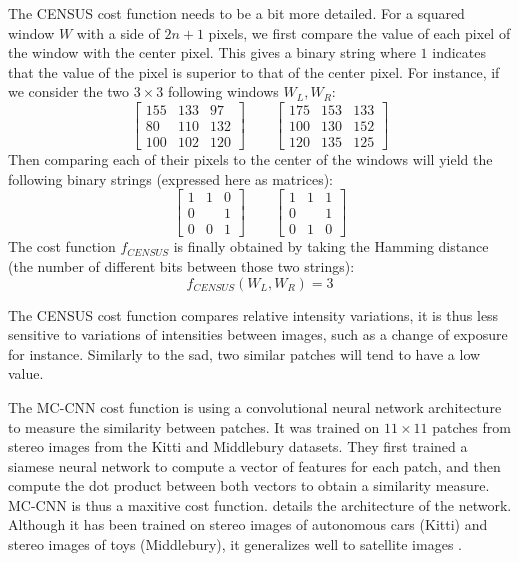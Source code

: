 \begin{example}
	The CENSUS cost function needs to be a bit more detailed. For a squared window $W$ with a side of $2n+1$ pixels, we first compare the value of each pixel of the window with the center pixel. This gives a binary string where $1$ indicates that the value of the pixel is superior to that of the center pixel. For instance, if we consider the two $3\times3$ following windows $W_L, W_R$:
	$$
    \begin{bmatrix}
        155 & 133 & 97 \\
        80 & 110 & 132 \\
        100 & 102 & 120
    \end{bmatrix}
    \qquad
    \begin{bmatrix}
        175 & 153 & 133 \\
        100 & 130 & 152 \\
        120 & 135 & 125
    \end{bmatrix}
	$$
	Then comparing each of their pixels to the center of the windows will yield the following binary strings (expressed here as matrices):
	$$
    \begin{bmatrix}
        1 & 1 & 0 \\
        0 &  & 1 \\
        0 & 0 & 1
    \end{bmatrix}
    \qquad
    \begin{bmatrix}
        1 & 1 & 1 \\
        0 &  & 1 \\
        0 & 1 & 0
    \end{bmatrix}
	$$
	The cost function $f_{CENSUS}$ is finally obtained by taking the Hamming distance (\ie the number of different bits between those two strings):
	\begin{equation*}
		f_{CENSUS}(W_L, W_R) = 3
	\end{equation*}
	
	The CENSUS cost function compares relative intensity variations, it is thus less sensitive to variations of intensities between images, such as a change of exposure for instance. Similarly to the \acrshort{sad}, two similar patches will tend to have a low value.
	
	The MC-CNN cost function \cite{zbontar_stereo_2016} is using a convolutional neural network architecture to measure the similarity between patches. It was trained on $11\times 11$ patches from stereo images from the Kitti \cite{geiger_vision_2013, menze_object_2015} and Middlebury \cite{scharstein_taxonomy_2001,scharstein_high-accuracy_2003,hirschmuller_evaluation_2007,scharstein_learning_2007,scharstein_high-resolution_2014} datasets. They first trained a siamese neural network to compute a vector of features for each patch, and then compute the dot product between both vectors to obtain a similarity measure. MC-CNN is thus a maxitive cost function.  details the architecture of the network. Although it has been trained on stereo images of autonomous cars (Kitti) and stereo images of toys (Middlebury), it generalizes well to satellite images \cite{defonte_evaluation_2021}.
	

\end{example}
